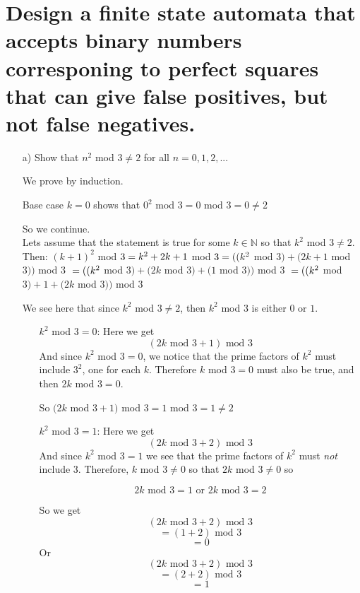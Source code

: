 \documentclass{article}
\begin{document}
	\section{Design a finite state automata that accepts binary numbers 
		corresponing to perfect squares that can give false positives, 
	but not false negatives.}

	\begin{itemize}
		\item[a)] Show that $n^2$ mod $3 \neq 2$ for all $n = 0,1,2,...$

			We prove by induction.

			Base case $k=0$ shows that $0^2$ mod $3 = 0$ mod $3 = 0 \neq 2$

			So we continue. \\ Lets assume that the statement is true for 
			some $k \in \mathbb{N}$ so that $k^2$ mod $3 \neq 2$. \\ 
			Then: $(k+1)^2$ mod $3 \\ = k^2 + 2k + 1$ mod $3 \\ = ((k^2$ mod 
			$3) + (2k + 1$ mod $3))$ mod $3$
			$\\ = ((k^2$ mod $3) + (2k$ mod $3) + (1$ mod $3))$ mod $3$
			$\\ = ((k^2$ mod $3) + 1 + (2k$ mod $3))$ mod $3$

			We see here that since $k^2$ mod $3 \neq 2$, then $k^2$ mod $3$ 
			is either $0$ or $1$.

			\begin{itemize}
				\item[]$k^2$ mod $3 = 0$: Here we get 
					\[(2k\text{ mod }3 + 1)\text{ mod }3\]
					And since $k^2$ mod $3 = 0$, we notice that the prime 
					factors of $k^2$ must include $3^2$, one for each $k$.
					Therefore $k$ mod $3 = 0$ must also be true, 
					and then $2k$ mod $3 = 0$.

					So $(2k$ mod $3 + 1)$ mod $3 = 1$ mod $3 = 1 \neq 2$
				\item[]$k^2$ mod $3 = 1$: Here we get
					\[(2k\text{ mod }3 + 2)\text{ mod }3\]
					And since $k^2$ mod $3 = 1$ we see that the prime 
					factors of $k^2$ must \textit{not} include $3$. 
					Therefore, $k$ mod $3 \neq 0$ so that $2k$ mod 
					$3 \neq 0$ so 

					\[2k \text{ mod } 3 = 1 \text{ or } 2k 
					\text{ mod } 3 = 2\]

					So we get 
					\[(2k \text{ mod } 3 + 2) \text{ mod } 3\]
					\[= (1 + 2) \text{ mod } 3\]
					\[= 0\]
					Or 
					\[(2k \text{ mod } 3 + 2) \text{ mod } 3\]
					\[= (2 + 2) \text{ mod } 3\]
					\[= 1\]


\end{itemize}
\end{itemize}
\end{document}
